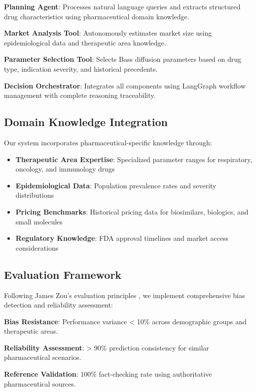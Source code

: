 \documentclass{article}
\begin{document}
\textbf{Planning Agent}: Processes natural language queries and extracts structured drug characteristics using pharmaceutical domain knowledge.

\textbf{Market Analysis Tool}: Autonomously estimates market size using epidemiological data and therapeutic area knowledge.

\textbf{Parameter Selection Tool}: Selects Bass diffusion parameters based on drug type, indication severity, and historical precedents.

\textbf{Decision Orchestrator}: Integrates all components using LangGraph workflow management with complete reasoning traceability.

\subsection{Domain Knowledge Integration}

Our system incorporates pharmaceutical-specific knowledge through:

\begin{itemize}
    \item \textbf{Therapeutic Area Expertise}: Specialized parameter ranges for respiratory, oncology, and immunology drugs
    \item \textbf{Epidemiological Data}: Population prevalence rates and severity distributions
    \item \textbf{Pricing Benchmarks}: Historical pricing data for biosimilars, biologics, and small molecules
    \item \textbf{Regulatory Knowledge}: FDA approval timelines and market access considerations
\end{itemize}

\subsection{Evaluation Framework}

Following James Zou's evaluation principles \cite{zou_bias_2024}, we implement comprehensive bias detection and reliability assessment:

\textbf{Bias Resistance}: Performance variance < 10\% across demographic groups and therapeutic areas.

\textbf{Reliability Assessment}: > 90\% prediction consistency for similar pharmaceutical scenarios.

\textbf{Reference Validation}: 100\% fact-checking rate using authoritative pharmaceutical sources.
\end{document}

